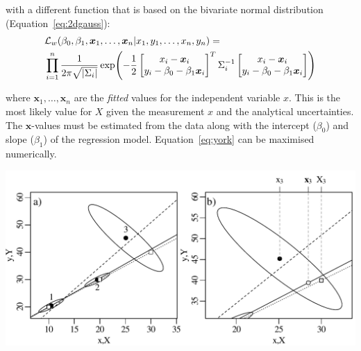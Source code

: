 \noindent with a different function that is based on the bivariate
normal distribution (Equation~\ref{eq:2dgauss}):
\begin{equation}
  \begin{split}
  & \mathcal{L}_w(\beta_0,\beta_1,\boldsymbol{x}_1,\ldots,\boldsymbol{x}_n|x_1,y_1,\ldots,x_n,y_n) =  \\
  & \prod\limits_{i=1}^{n}\frac{1}{2 \pi \sqrt{|\Sigma_i|}}
  \exp\!\left(-\frac{1}{2}
  \left[
    \begin{array}{@{}c@{}}
      x_i - \boldsymbol{x}_i\\
      y_i - \beta_0 - \beta_1\boldsymbol{x}_i\\
    \end{array}
    \right]^T
  \Sigma_i^{-1}
  \left[
  \begin{array}{@{}c@{}}
      x_i - \boldsymbol{x}_i\\
      y_i - \beta_0 - \beta_1\boldsymbol{x}_i\\
    \end{array}
  \right] \right) \\
  \end{split}
  \label{eq:york}
\end{equation}

\noindent where $\boldsymbol{x}_1,\ldots,\boldsymbol{x}_n$ are the
\emph{fitted} values for the independent variable $x$. This is the
most likely value for $X$ given the measurement $x$ and the analytical
uncertainties. The $\boldsymbol{x}$-values must be estimated from the
data along with the intercept ($\beta_0$) and slope ($\beta_1$) of the
regression model. Equation~\ref{eq:york} can be maximised numerically.

\noindent\begin{minipage}[t][][b]{.65\textwidth}
  \includegraphics[width=\textwidth]{../figures/yorkfit.pdf}
\end{minipage}
\begin{minipage}[t][][t]{.35\textwidth}
  \label{fig:yorkfit}
\end{minipage}
